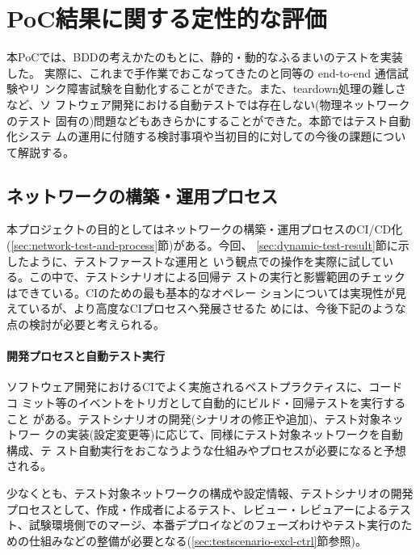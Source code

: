 \section{PoC結果に関する定性的な評価}

本PoCでは、BDDの考えかたのもとに、静的・動的なふるまいのテストを実装した。
実際に、これまで手作業でおこなってきたのと同等の end-to-end 通信試験やリ
ンク障害試験を自動化することができた。また、teardown処理の難しさなど、ソ
フトウェア開発における自動テストでは存在しない(物理ネットワークのテスト
固有の)問題などもあきらかにすることができた。本節ではテスト自動化システ
ムの運用に付随する検討事項や当初目的に対しての今後の課題について解説する。

  \subsection{ネットワークの構築・運用プロセス}

本プロジェクトの目的としてはネットワークの構築・運用プロセスのCI/CD化
(\ref{sec:network-test-and-process}節)がある。今回、
\ref{sec:dynamic-test-result}節に示したように、テストファーストな運用と
いう観点での操作を実際に試している。この中で、テストシナリオによる回帰テ
ストの実行と影響範囲のチェックはできている。CIのための最も基本的なオペレー
ションについては実現性が見えているが、より高度なCIプロセスへ発展させるた
めには、今後下記のような点の検討が必要と考えられる。

    \paragraph{開発プロセスと自動テスト実行}
ソフトウェア開発におけるCIでよく実施されるベストプラクティスに、コードコ
ミット等のイベントをトリガとして自動的にビルド・回帰テストを実行すること
がある。テストシナリオの開発(シナリオの修正や追加)、テスト対象ネットワー
クの実装(設定変更等)に応じて、同様にテスト対象ネットワークを自動構成、テ
スト自動実行をおこなうような仕組みやプロセスが必要になると予想される。

少なくとも、テスト対象ネットワークの構成や設定情報、テストシナリオの開発
プロセスとして、作成・作成者によるテスト、レビュー・レビュアーによるテス
ト、試験環境側でのマージ、本番デプロイなどのフェーズわけやテスト実行のた
めの仕組みなどの整備が必要となる(\ref{sec:testscenario-excl-ctrl}節参照)。

